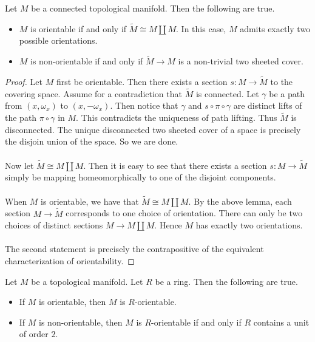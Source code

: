 \documentclass[a4paper]{article}
\begin{document}
\begin{prp}{}{} Let $M$ be a connected topological manifold. Then the following are true. 
\begin{itemize}
\item $M$ is orientable if and only if $\widetilde{M}\cong M\amalg M$. In this case, $M$ admits exactly two possible orientations. 
\item $M$ is non-orientable if and only if $\widetilde{M}\to M$ is a non-trivial two sheeted cover. 
\end{itemize} \tcbline
\begin{proof}
Let $M$ first be orientable. Then there exists a section $s:M\to\widetilde{M}$ to the covering space. Assume for a contradiction that $\widetilde{M}$ is connected. Let $\gamma$ be a path from $(x,\omega_x)$ to $(x,-\omega_x)$. Then notice that $\gamma$ and $s\circ\pi\circ\gamma$ are distinct lifts of the path $\pi\circ\gamma$ in $M$. This contradicts the uniqueness of path lifting. Thus $\widetilde{M}$ is disconnected. The unique disconnected two sheeted cover of a space is precisely the disjoin union of the space. So we are done. \\~\\

Now let $\widetilde{M}\cong M\amalg M$. Then it is easy to see that there exists a section $s:M\to\widetilde{M}$ simply be mapping homeomorphically to one of the disjoint components. \\~\\

When $M$ is orientable, we have that $\widetilde{M}\cong M\amalg M$. By the above lemma, each section $M\to\widetilde{M}$ corresponds to one choice of orientation. There can only be two choices of distinct sections $M\to M\amalg M$. Hence $M$ has exactly two orientations. \\~\\

The second statement is precisely the contrapositive of the equivalent characterization of orientability. 
\end{proof}
\end{prp}

\begin{lmm}{}{} Let $M$ be a topological manifold. Let $R$ be a ring. Then the following are true. 
\begin{itemize}
\item If $M$ is orientable, then $M$ is $R$-orientable. 
\item If $M$ is non-orientable, then $M$ is $R$-orientable if and only if $R$ contains a unit of order $2$. 
\end{itemize}
\end{lmm}
\end{document}
